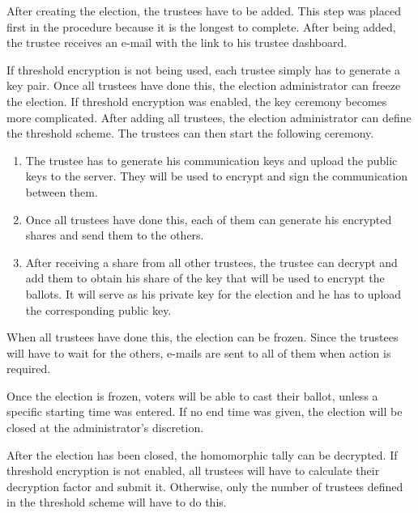 \par After creating the election, the trustees have to be added. This step was placed first in the procedure because it is the longest to complete. After being added, the trustee receives an e-mail with the link to his trustee dashboard.

\par If threshold encryption is not being used, each trustee simply has to generate a key pair. Once all trustees have done this, the election administrator can freeze the election. If threshold encryption was enabled, the key ceremony becomes more complicated. After adding all trustees, the election administrator can define the threshold scheme. The trustees can then start the following ceremony.

\begin{enumerate}
  \item The trustee has to generate his communication keys and upload the public keys to the server. They will be used to encrypt and sign the communication between them.
  \item Once all trustees have done this, each of them can generate his encrypted shares and send them to the others.
  \item After receiving a share from all other trustees, the trustee can decrypt and add them to obtain his share of the key that will be used to encrypt the ballots. It will serve as his private key for the election and he has to upload the corresponding public key.
\end{enumerate}

\par When all trustees have done this, the election can be frozen. Since the trustees will have to wait for the others, e-mails are sent to all of them when action is required.

\par Once the election is frozen, voters will be able to cast their ballot, unless a specific starting time was entered. If no end time was given, the election will be closed at the administrator's discretion.

\par After the election has been closed, the homomorphic tally can be decrypted. If threshold encryption is not enabled, all trustees will have to calculate their decryption factor and submit it. Otherwise, only the number of trustees defined in the threshold scheme will have to do this.
